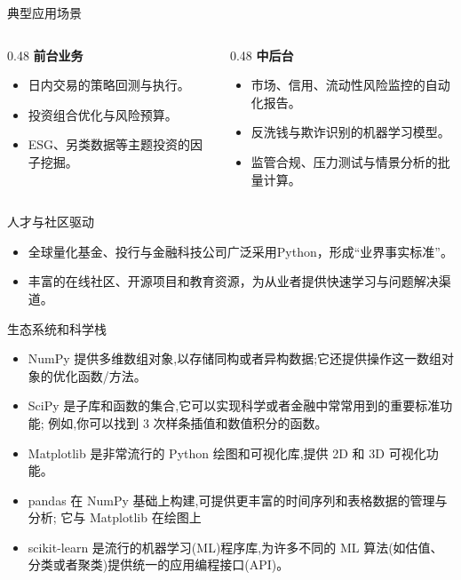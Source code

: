 \documentclass[9pt]{ctexbeamer}
\begin{document}
\begin{frame}{典型应用场景}
    \begin{columns}[T,totalwidth=\textwidth]
        \begin{column}{0.48\textwidth}
            \textbf{前台业务}
            \begin{itemize}
                \item 日内交易的策略回测与执行。
                \item 投资组合优化与风险预算。
                \item ESG、另类数据等主题投资的因子挖掘。
            \end{itemize}
        \end{column}
        \begin{column}{0.48\textwidth}
            \textbf{中后台}
            \begin{itemize}
                \item 市场、信用、流动性风险监控的自动化报告。
                \item 反洗钱与欺诈识别的机器学习模型。
                \item 监管合规、压力测试与情景分析的批量计算。
            \end{itemize}
        \end{column}
    \end{columns}
\end{frame}

\begin{frame}{人才与社区驱动}
    \begin{itemize}
        \item 全球量化基金、投行与金融科技公司广泛采用Python，形成“业界事实标准”。
        \item 丰富的在线社区、开源项目和教育资源，为从业者提供快速学习与问题解决渠道。
    \end{itemize}
\end{frame}




\begin{frame}{生态系统和科学栈}
	\begin{itemize}
		\item NumPy 提供多维数组对象,以存储同构或者异构数据;它还提供操作这一数组对 象的优化函数/方法。  \item SciPy 是子库和函数的集合,它可以实现科学或者金融中常常用到的重要标准功能; 例如,你可以找到 3 次样条插值和数值积分的函数。
		\item Matplotlib 是非常流行的 Python 绘图和可视化库,提供 2D 和 3D 可视化功能。
		\item pandas 在 NumPy 基础上构建,可提供更丰富的时间序列和表格数据的管理与分析; 它与 Matplotlib 在绘图上
		\item scikit-learn 是流行的机器学习(ML)程序库,为许多不同的 ML 算法(如估值、 分类或者聚类)提供统一的应用编程接口(API)。
	\end{itemize}
	
\end{frame}
\end{document}
